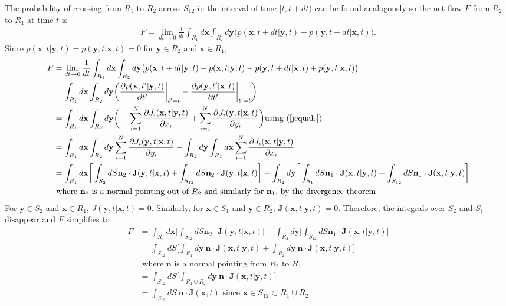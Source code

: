 \documentclass{article}
\newcommand{\mb}{\mathbf}
\begin{document}
\begin{pf}
The probability of crossing from $R_1$ to $R_2$ across $S_{12}$  in the interval of time $[t,t+dt)$ can be found analogously so the net flow $F$ from $R_2$ to $R_1$ at time $t$ is 
\begin{align*}
F=\lim_{dt \to 0}\frac{1}{dt}\int_{R_1}d{\mb x}\int_{R_2}d{\mb y} \big(p({\mb x},t+dt|{\mb y},t)-p({\mb y},t+dt|{\mb x},t)\big).
\end{align*}
Since $p({\mb x},t|{\mb y},t)=p({\mb y},t|{\mb x},t)=0$ for ${\mb y}\in R_2$ and ${\mb x}\in R_1$,
\begin{align*}
F&=\lim_{dt \to 0}\frac{1}{dt}\int_{R_1}d{\mb x}\int_{R_2}d{\mb y} \big(p({\mb x},t+dt|{\mb y},t)-p({\mb x},t|{\mb y},t)-p({\mb y},t+dt|{\mb x},t)+p({\mb y},t|{\mb x},t)\big)
\\&=\int_{R_1}d{\mb x}\int_{R_2}d{\mb y} \bigg(\frac{\partial p({\mb x},t'|{\mb y},t)}{\partial t'}\bigg|_{t'=t}-\frac{\partial p({\mb y},t'|{\mb x},t)}{\partial t'}\bigg|_{t'=t}\bigg)
\\&=\int_{R_1}d{\mb x}\int_{R_2}d{\mb y}\bigg(-\sum_{i=1}^N\frac{\partial J_i({\mb x},t|{\mb y},t)}{\partial x_i}+\sum_{i=1}^N\frac{\partial J_i({\mb y},t|{\mb x},t)}{\partial y_i}\bigg) \text{using (\ref{jequals})}
\\&=\int_{R_1}d{\mb x}\int_{R_2}d{\mb y}\sum_{i=1}^N\frac{\partial J_i({\mb y},t|{\mb x},t)}{\partial y_i}-\int_{R_2}d{\mb y}\int_{R_1}d{\mb x}\sum_{i=1}^N\frac{\partial J_i({\mb x},t|{\mb y},t)}{\partial x_i}
\\&=\int_{R_1}d{\mb x}\bigg[\int_{S_2}dS {\mb n_2}\cdot {\mb J}({\mb y},t|{\mb x},t)+\int_{S_{12}}dS {\mb n_2}\cdot {\mb J}({\mb y},t|{\mb x},t)\bigg]-\int_{R_2}d{\mb y}\bigg[\int_{S_1}dS{\mb n}_1\cdot{\mb J}({\mb x},t|{\mb y},t)+\int_{S_{12}}dS{\mb n}_1\cdot{\mb J}({\mb x},t|{\mb y},t)\bigg]
\\ &\text{ where ${\mb n}_2$ is a normal pointing out of $R_2$ and similarly for ${\mb n}_1$, by the divergence theorem}
\end{align*}
For ${\mb y}\in S_2$ and ${\mb x}\in R_1$, $J({\mb y},t|{\mb x},t)=0$. Similarly, for ${\mb x}\in S_1$ and ${\mb y}\in R_2$, ${\mb J}({\mb x},t|{\mb y},t)=0$.  Therefore, the integrals over $S_2$ and $S_1$ disappear and $F$ simplifies to
\begin{align*}
F&=\int_{R_1}d{\mb x}\bigg[\int_{S_{12}}dS {\mb n_2}\cdot {\mb J}({\mb y},t|{\mb x},t)\bigg]-\int_{R_2}d{\mb y}\bigg[\int_{S_{12}}dS{\mb n}_1\cdot{\mb J}({\mb x},t|{\mb y},t)\bigg]
\\&=\int_{S_{12}}dS\bigg[\int_{R_1}d{\mb y}\ {\mb n}\cdot \mb{J}({\mb x},t|{\mb y},t)+\int_{R_2}d{\mb y}\ {\mb n}\cdot {\mb J}({\mb x},t|{\mb y},t)\bigg]
\\ & \text{ where ${\mb n}$ is a normal pointing from $R_2$ to $R_1$}
\\&=\int_{S_{12}}dS\bigg[\int_{R_1\cup R_2}d{\mb y}\ {\mb n}\cdot \mb{J}({\mb x},t|{\mb y},t)\bigg]
\\&=\int_{S_{12}}dS\ {\mb n}\cdot {\mb J}({\mb x},t) \text{ since ${\mb x}\in S_{12}\subset R_1\cup R_2$}
\end{align*}
\end{pf}
\end{document}
